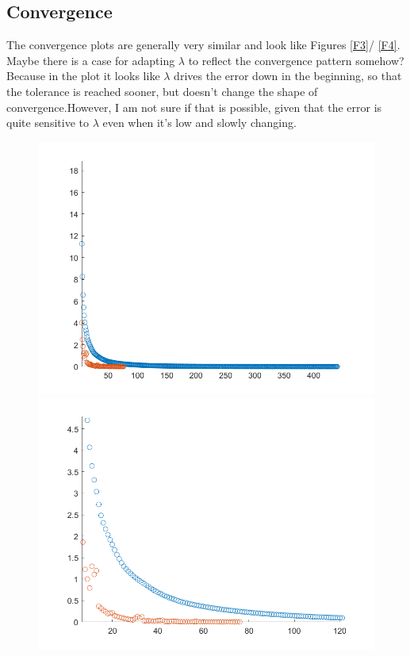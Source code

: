 \documentclass[11pt, a4paper]{article}
\theoremstyle{definition}
\begin{document}
\subsection{Convergence}
The convergence plots are generally very similar and look like Figures \ref{F3}/ \ref{F4}. Maybe there is a case for adapting $\lambda$ to reflect the convergence pattern somehow? Because in the plot it looks like $\lambda$ drives the error down in the beginning, so that the tolerance is reached sooner, but doesn't change the shape of convergence.However, I am not sure if that is possible, given that the error is quite sensitive to $\lambda$ even when it's low and slowly changing.
\begin{figure}[h]
	\centering
	\includegraphics[scale=0.6]{Ex10a.png}
	\includegraphics[scale=0.4]{Ex10b.png}

\end{figure}
\end{document}
